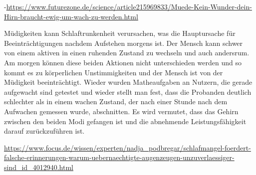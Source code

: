 -\url{https://www.futurezone.de/science/article215969833/Muede-Kein-Wunder-dein-Hirn-braucht-ewig-um-wach-zu-werden.html}

Müdigkeiten kann Schlaftrunkenheit verursachen, was die Hauptursache für Beeinträchtigungen nachdem Aufstehen morgens ist. Der Mensch kann schwer von einem aktiven in einen ruhenden Zustand zu wechseln und auch andersrum. Am morgen können diese beiden Aktionen nicht unterschieden werden und so kommt es zu körperlichen Unstimmigkeiten und der Mensch ist von der Müdigkeit beeinträchtigt. Wieder wurden Matheaufgaben an Nutzern, die gerade aufgewacht sind getestet und wieder stellt man fest, dass die Probanden deutlich schlechter als in einem wachen Zustand, der nach einer Stunde nach dem Aufwachen gemessen wurde, abschnitten. Es wird vermutet, dass das Gehirn zwischen den beiden Modi gefangen ist und die abnehmende Leistungsfähigkeit darauf zurückzuführen ist.

\url{https://www.focus.de/wissen/experten/nadja_podbregar/schlafmangel-foerdert-falsche-erinnerungen-warum-uebernaechtigte-augenzeugen-unzuverlaessiger-sind_id_4012940.html}
